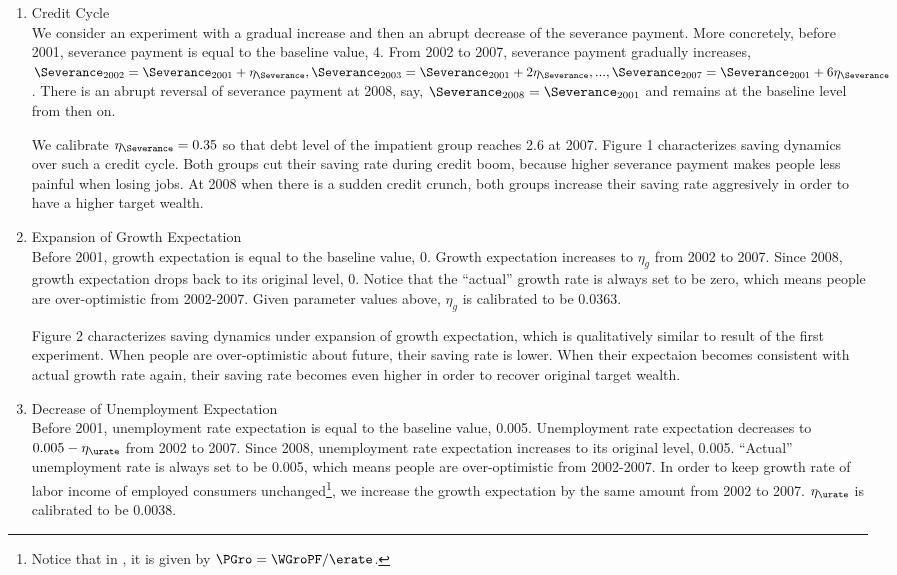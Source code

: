 \documentclass[titlepage,abstract,letterpaper]{econtex}
\begin{document}
\begin{enumerate}
\item Credit Cycle\\
We consider an experiment with a gradual increase and then an abrupt decrease of the severance payment. More concretely, before 2001, severance payment is equal to the baseline value, 4. From 2002 to 2007, severance payment gradually increases, $\Severance_{2002}=\Severance_{2001}+\eta_{\Severance},\Severance_{2003}=\Severance_{2001}+2\eta_{\Severance},...,\Severance_{2007}=\Severance_{2001}+6\eta_{\Severance}$. There is an abrupt reversal of severance payment at 2008, say, $\Severance_{2008}=\Severance_{2001}$ and remains at the baseline level from then on. 

We calibrate $\eta_{\Severance}=0.35$ so that debt level of the impatient group reaches 2.6 at 2007.
Figure 1 characterizes saving dynamics over such a credit cycle. Both groups cut their saving rate during credit boom, because higher severance payment makes people less painful when losing jobs. At 2008 when there is a sudden credit crunch, both groups increase their saving rate aggresively in order to have a higher target wealth.

\item Expansion of Growth Expectation\\
Before 2001, growth expectation is equal to the baseline value, 0. Growth expectation increases to $\eta_g$ from 2002 to 2007. Since 2008, growth expectation drops back to its original level, 0. Notice that the ``actual'' growth rate is always set to be zero, which means people are over-optimistic from 2002-2007. Given parameter values above, $\eta_g$ is calibrated to be 0.0363. 

Figure 2 characterizes saving dynamics under expansion of growth expectation, which is qualitatively similar to result of the first experiment. When people are over-optimistic about future, their saving rate is lower. When their expectaion becomes consistent with actual growth rate again, their saving rate becomes even higher in order to recover original target wealth.

\item Decrease of Unemployment Expectation\\
Before 2001, unemployment rate expectation is equal to the baseline value, 0.005. Unemployment rate expectation decreases to $0.005-\eta_{\urate}$ from 2002 to 2007. Since 2008, unemployment rate expectation increases to its original level, 0.005.  ``Actual'' unemployment rate is always set to be 0.005, which means people are over-optimistic from 2002-2007. In order to keep growth rate of labor income of employed consumers unchanged\footnote{Notice that in \cite{ctDiscrete}, it is given by $\PGro = \WGroPF/\erate$.}, we increase the growth expectation by the same amount from 2002 to 2007.  $\eta_{\urate}$ is calibrated to be 0.0038.


\end{enumerate}
\end{document}
